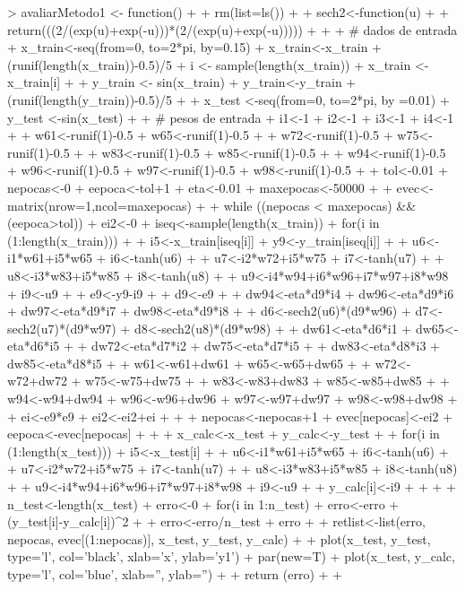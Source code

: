 \documentclass{article}
\begin{document}
\begin{Schunk}
\begin{Sinput}
> avaliarMetodo1 <- function() {
+ 
+   rm(list=ls())
+ 
+   sech2<-function(u)
+   {
+     return(((2/(exp(u)+exp(-u)))*(2/(exp(u)+exp(-u))))) 
+   }
+ 
+   # dados de entrada
+   x_train<-seq(from=0, to=2*pi, by=0.15)
+   x_train<-x_train + (runif(length(x_train))-0.5)/5
+   i <- sample(length(x_train))
+   x_train <- x_train[i]
+ 
+   y_train <- sin(x_train)
+   y_train<-y_train + (runif(length(y_train))-0.5)/5
+ 
+   x_test <-seq(from=0, to=2*pi, by =0.01)
+   y_test <-sin(x_test)
+ 
+   # pesos de entrada
+   i1<-1
+   i2<-1
+   i3<-1
+   i4<-1
+ 
+   w61<-runif(1)-0.5
+   w65<-runif(1)-0.5
+ 
+   w72<-runif(1)-0.5
+   w75<-runif(1)-0.5
+ 
+   w83<-runif(1)-0.5
+   w85<-runif(1)-0.5
+ 
+   w94<-runif(1)-0.5
+   w96<-runif(1)-0.5
+   w97<-runif(1)-0.5
+   w98<-runif(1)-0.5
+ 
+   tol<-0.01
+   nepocas<-0
+   eepoca<-tol+1
+   eta<-0.01
+   maxepocas<-50000
+ 
+   evec<-matrix(nrow=1,ncol=maxepocas) 
+ 
+   while ((nepocas < maxepocas) && (eepoca>tol)){
+     ei2<-0
+     iseq<-sample(length(x_train))
+     for(i in (1:length(x_train))) {
+     
+       i5<-x_train[iseq[i]]
+       y9<-y_train[iseq[i]]
+       
+       u6<-i1*w61+i5*w65
+       i6<-tanh(u6)
+       
+       u7<-i2*w72+i5*w75
+       i7<-tanh(u7)
+       
+       u8<-i3*w83+i5*w85
+       i8<-tanh(u8)
+       
+       u9<-i4*w94+i6*w96+i7*w97+i8*w98
+       i9<-u9
+       
+       e9<-y9-i9
+       
+       d9<-e9
+       
+       dw94<-eta*d9*i4
+       dw96<-eta*d9*i6
+       dw97<-eta*d9*i7
+       dw98<-eta*d9*i8
+ 
+       d6<-sech2(u6)*(d9*w96)
+       d7<-sech2(u7)*(d9*w97)
+       d8<-sech2(u8)*(d9*w98)
+       
+       dw61<-eta*d6*i1
+       dw65<-eta*d6*i5
+ 
+       dw72<-eta*d7*i2
+       dw75<-eta*d7*i5
+ 
+       dw83<-eta*d8*i3
+       dw85<-eta*d8*i5
+ 
+       w61<-w61+dw61
+       w65<-w65+dw65
+ 
+       w72<-w72+dw72
+       w75<-w75+dw75
+ 
+       w83<-w83+dw83
+       w85<-w85+dw85
+ 
+       w94<-w94+dw94
+       w96<-w96+dw96
+       w97<-w97+dw97
+       w98<-w98+dw98
+ 
+       ei<-e9*e9
+       ei2<-ei2+ei
+     }
+     
+     nepocas<-nepocas+1 
+     evec[nepocas]<-ei2
+     eepoca<-evec[nepocas]
+   }
+ 
+   x_calc<-x_test
+   y_calc<-y_test
+ 
+   for(i in (1:length(x_test))) {
+     i5<-x_test[i]
+ 
+     u6<-i1*w61+i5*w65
+     i6<-tanh(u6)
+ 
+     u7<-i2*w72+i5*w75
+     i7<-tanh(u7)
+ 
+     u8<-i3*w83+i5*w85
+     i8<-tanh(u8)
+ 
+     u9<-i4*w94+i6*w96+i7*w97+i8*w98
+     i9<-u9
+ 
+     y_calc[i]<-i9
+ 
+   }
+ 
+   n_test<-length(x_test)
+   erro<-0
+   for(i in 1:n_test)
+     erro<-erro + (y_test[i]-y_calc[i])^2
+ 
+   erro<-erro/n_test
+   erro  
+ 
+   retlist<-list(erro, nepocas, evec[(1:nepocas)], x_test, y_test, y_calc)
+ 
+   plot(x_test, y_test, type='l', col='black', xlab='x', ylab='y1')
+   par(new=T)
+   plot(x_test, y_calc, type='l', col='blue', xlab='', ylab='')
+   
+   return (erro)
+ 
+ }
\end{Sinput}
\end{Schunk}
\end{document}

